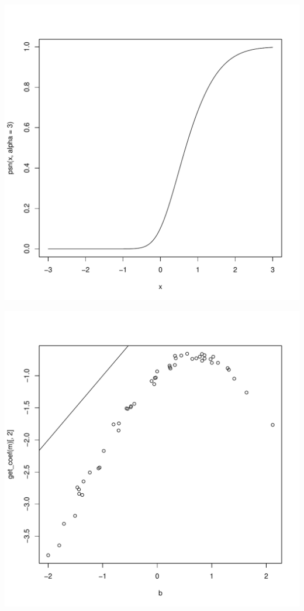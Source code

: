 \documentclass{article}\usepackage[]{graphicx}\usepackage[]{color}
\makeatletter
\def\maxwidth{ %
  \ifdim\Gin@nat@width>\linewidth
    \linewidth
  \else
    \Gin@nat@width
  \fi
}
\newenvironment{knitrout}{}{} %
\makeatother
\begin{document}
\begin{knitrout}
\includegraphics[width=\maxwidth]{figure/unnamed-chunk-7-2} 

\includegraphics[width=\maxwidth]{figure/unnamed-chunk-7-3} 

\end{knitrout}
\end{document}
